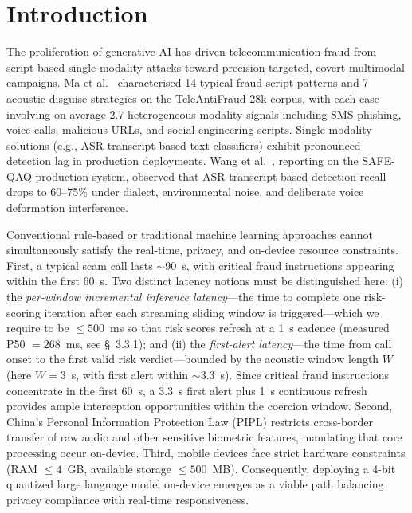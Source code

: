 \documentclass[11pt, a4paper]{article}
\begin{document}
\section{Introduction}

The proliferation of generative AI has driven telecommunication fraud from script-based single-modality attacks toward precision-targeted, covert multimodal campaigns. Ma et al.~\cite{1} characterised 14 typical fraud-script patterns and 7 acoustic disguise strategies on the TeleAntiFraud-28k corpus, with each case involving on average 2.7 heterogeneous modality signals including SMS phishing, voice calls, malicious URLs, and social-engineering scripts. Single-modality solutions (e.g., ASR-transcript-based text classifiers) exhibit pronounced detection lag in production deployments. Wang et al.~\cite{2}, reporting on the SAFE-QAQ production system, observed that ASR-transcript-based detection recall drops to 60--75\% under dialect, environmental noise, and deliberate voice deformation interference.

Conventional rule-based or traditional machine learning approaches cannot simultaneously satisfy the real-time, privacy, and on-device resource constraints. First, a typical scam call lasts $\sim$90~s, with critical fraud instructions appearing within the first 60~s. Two distinct latency notions must be distinguished here: (i) the \emph{per-window incremental inference latency}---the time to complete one risk-scoring iteration after each streaming sliding window is triggered---which we require to be $\le 500$~ms so that risk scores refresh at a 1~s cadence (measured P50 $=268$~ms, see \S~3.3.1); and (ii) the \emph{first-alert latency}---the time from call onset to the first valid risk verdict---bounded by the acoustic window length $W$ (here $W=3$~s, with first alert within $\sim$3.3~s). Since critical fraud instructions concentrate in the first 60~s, a 3.3~s first alert plus 1~s continuous refresh provides ample interception opportunities within the coercion window. Second, China's Personal Information Protection Law (PIPL) restricts cross-border transfer of raw audio and other sensitive biometric features, mandating that core processing occur on-device. Third, mobile devices face strict hardware constraints (RAM $\le 4$~GB, available storage $\le 500$~MB). Consequently, deploying a 4-bit quantized large language model on-device emerges as a viable path balancing privacy compliance with real-time responsiveness.
\end{document}
